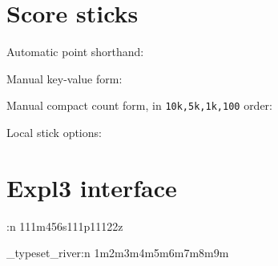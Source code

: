 \documentclass{article}
\begin{document}

\section*{Score sticks}

Automatic point shorthand:



Manual key-value form:



Manual compact count form, in \texttt{10k,5k,1k,100} order:



Local stick options:


\section*{Expl3 interface}

\ExplSyntaxOn
\mahjongtiles:n {111m456s111p11122z}
\par
\mahjongtiles_typeset_river:n {1m2m3m4m5m6m7m8m9m}
\ExplSyntaxOff
\end{document}
